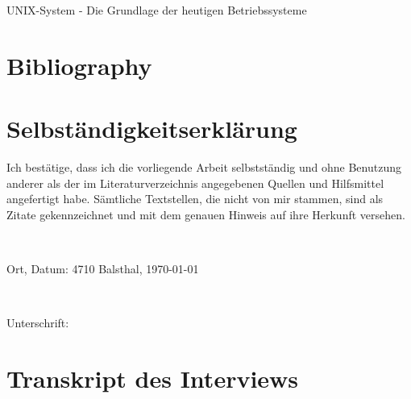 \documentclass[a4paper, 11pt]{article}
\begin{document}
    \begin{titlepage}
        \centering
        \vspace*{120pt}
        \LARGE UNIX-System - Die Grundlage der heutigen Betriebssysteme \par
        \vspace{0.5cm}
        \Large \subtitle{wissenschaftliche Arbeit} \par
        \vfill
    \end{titlepage}
    \newpage


    \tableofcontents
    \newpage


    
    \newpage

    
    \newpage

    
    \newpage

    
    \newpage

    
    \newpage

    
    \newpage


    \section{Bibliography}
    \printbibliography[heading=none]
    \nocite{*}
    \newpage


    \section{Selbständigkeitserklärung}
    Ich bestätige, dass ich die vorliegende Arbeit selbstständig und ohne Benutzung anderer als der im Literaturverzeichnis angegebenen Quellen und Hilfsmittel angefertigt habe.
    Sämtliche Textstellen, die nicht von mir stammen, sind als Zitate gekennzeichnet und mit dem genauen Hinweis auf ihre Herkunft versehen.

    \

    Ort, Datum: \hspace{120pt} 4710 Balsthal, \today

    \

    Unterschrift:
    \newpage


    \appendix
    \section{Transkript des Interviews}
    
\end{document}
